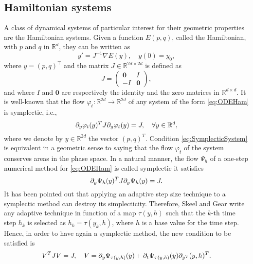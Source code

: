 \documentclass{siamart1116}
\numberwithin{theorem}{section}
\renewcommand{\phi}{\varphi}
\newcommand{\pdv}[2]{\ensuremath\partial_{#2}#1}
\newcommand{\R}{\mathbb{R}}
\newcommand{\corr}[1]{{\color{bordeaux}#1}}
\begin{document}
\subsection{Hamiltonian systems} A class of dynamical systems of particular interest for their geometric properties are the Hamiltonian systems. Given a function $E(p, q)$, called the Hamiltonian, with $p$ and $q$ in $\R^d$, they can be written as
\begin{equation}\label{eq:ODEHam}
y' = J^{-1}\nabla E(y), \quad y(0) = y_0,
\end{equation}
where \corr{$y = (p, q)^\top$ and} the matrix $J\in\R^{2d \times 2d}$ is defined as
\begin{equation}
J = \begin{pmatrix} \mathbf{0} & I \\ -I & \mathbf{0} \end{pmatrix},
\end{equation}
and where $I$ and $\mathbf{0}$ are respectively the identity and the zero matrices in $\R^{d\times d}$. It is well-known that the flow $\phi_t\colon\R^{2d}\to\R^{2d}$ of any system of the form \eqref{eq:ODEHam} is symplectic, i.e., 
\corr{\begin{equation}\label{eq:SymplecticSystem}
\pdv{\phi_t(y)}{y}^T J \pdv{\phi_t(y)}{y} = J, \quad \forall y \in \R^d,
\end{equation}}
where we denote by $y\in \R^{2d}$ the vector $(p, q)^T$. Condition \eqref{eq:SymplecticSystem} is equivalent in a geometric sense to saying that the flow $\phi_t$ of the system conserves areas in the phase space. In a natural manner, the flow $\Psi_h$ of a one-step numerical method for \eqref{eq:ODEHam} is called symplectic it satisfies
\begin{equation}\label{eq:SymplecticMethod}
\pdv{\Psi_h(y)}{y}^T J \pdv{\Psi_h(y)}{y} = J.
\end{equation}
It has been pointed out \cite{SkG92, HLW06} that applying an adaptive step size technique to a symplectic method can \corr{destroy its simplecticity. Therefore}, Skeel and Gear \cite{SkG92} write any adaptive technique in function of a map \corr{$\tau(y, h)$ such that the $k$-th time step $h_k$ is selected as $h_k = \tau(y_k, h)$, where $h$ is a base value for the time step.} Hence, in order to have again a symplectic method, the new condition to be satisfied is
\corr{\begin{equation}
V^T J V = J, \quad V = \pdv{\Psi_{\tau(y, h)}(y)}{y} + \pdv{\Psi_{\tau(y, h)}(y)}{t}\pdv{\tau(y, h)}{y}^T.
\end{equation}}
\end{document}
